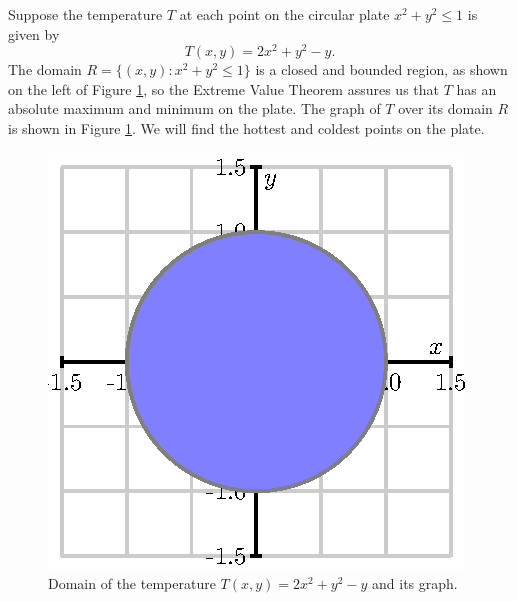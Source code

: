\begin{example} Suppose the temperature $T$ at each point on the
  circular plate $x^2+y^2 \leq 1$ is given by
  \[T(x,y) = 2x^2+y^2-y.\] The domain $R=\{(x,y):x^2+y^2 \leq 1\}$ is
  a closed and bounded region, as shown on the left of Figure
  \ref{F:10.7.temperature}, so the Extreme Value Theorem assures us
  that $T$ has an absolute maximum and minimum on the plate.  The
  graph of $T$ over its domain $R$ is shown in Figure
  \ref{F:10.7.temperature}.  We will find the hottest and coldest
  points on the plate.  

  \begin{figure}[ht]
    \begin{center}
      \includegraphics{figures/fig_10_7_temperature_domain.eps}
      \hspace*{20pt}
    \end{center}
    \caption{Domain of the temperature $T(x,y) = 2x^2+y^2-y$ and its graph.}
    \label{F:10.7.temperature}
  \end{figure}


\end{example}
